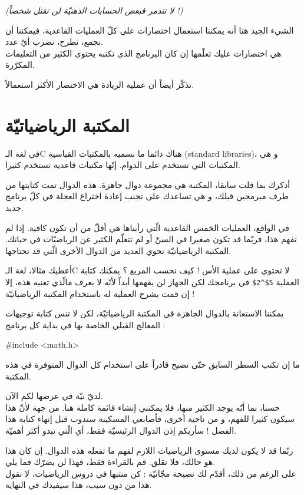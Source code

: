 \textit{(لا تتذمر فبعض الحسابات الذهنيّة لن تقتل شخصاً !)}

الشيء الجيد هنا أنه يمكننا استعمال اختصارات على كلّ العمليات القاعدية، فيمكننا أن نجمع، نطرح، نضرب أيّ عدد.\\
هي اختصارات عليك تعلّمها إن كان البرنامج الذي تكتبه يحتوي الكثير من التعليمات المكرّرة.

تذكّر أيضاً أن عملية الزيادة هي الاختصار الأكثر استعمالاً.

\section{المكتبة الرياضياتيّة}

في لغة الـ\textenglish{C}
هناك دائما ما نسميه بالمكتبات القياسية
(\textenglish{standard libraries})،
 و هي المكتبات التي تستخدم على الدوام. إنّها مكتبات قاعدية تستخدم كثيرا.

أذكرك بما قلت سابقا، المكتبة هي مجموعة دوال جاهزة. هذه الدوال تمت كتابتها من طرف مبرمجين قبلك، و هي تساعدك على تجنب إعادة اختراع العجلة في كلّ برنامج جديد.

في الواقع، العمليات الخمس القاعدية الّتي رأيناها هي أقلّ من أن تكون كافية. إذا لم تفهم هذا، فربّما قد تكون صغيرا في السنّ أو لم تتعلّم الكثير عن الرياضيّات في حياتك. المكتبة الرياضياتيّة تحوي العديد من الدوال الأخرى الّتي قد تحتاجها.


أعطيك مثالا، لغة الـ\textenglish{C}
لا تحتوي على عملية الأس ! كيف نحسب المربع ؟ يمكنك كتابة العملية
\texttt{5\$\^{}2\$}
في برنامجك لكن الجهاز لن يفهمها أبداً لأنّه لا يعرف مالّذي تعنيه هذه، إلا إن قمت بشرح العملية له باستخدام المكتبة الرياضياتيّة !

يمكننا الاستعانة بالدوال الجاهزة في المكتبة الرياضياتيّة، لكن لا تنس كتابة توجيهات المعالج القبلي الخاصة بها في بداية كل برنامج :

\begin{Csource}
  #include <math.h>
\end{Csource}

ما إن تكتب السطر السابق حتّى تصبح قادراً على استخدام كل الدوال المتوفرة في هذه المكتبة.

لديّ نيّة في عرضها لكم الآن.\\
حسنا، بما أنّه يوجد الكثير منها، فلا يمكنني إنشاء قائمة كاملة هنا. من جهة لأنّ هذا سيكون كثيرا للفهم، و من ناحية أخرى، فأصابعي  المسكينة ستذوب قبل إنهاء كتابة هذا الفصل ! سأريكم إذن الدوال الرئيسيّة فقط، أي الّتي تبدو أكثر أهميّة.

\begin{information}
ربّما قد لا يكون لديك مستوى  الرياضيات اللازم لفهم ما تفعله هذه الدوال. إن كان هذا هو حالك، فلا تقلق. قم بالقراءة فقط، فهذا لن يضرّك فما يلي.\\
على الرغم من ذلك، أقدّم لك نصيحة مجّانيّة : كن منتبها في دروس الرياضيات، لا نقول هذا من دون سبب، هذا سيفيدك في النهاية.
\end{information}

